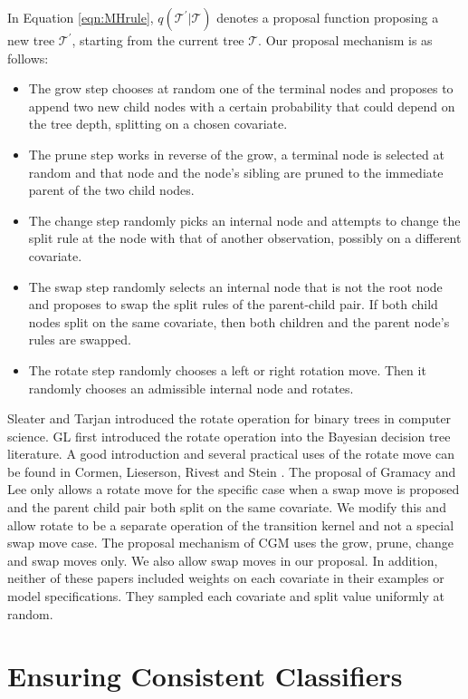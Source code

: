  In Equation \ref{eqn:MHrule}, $q(\mathcal{T}^\prime\vert\mathcal{T})$ denotes a proposal function proposing a new tree $\mathcal{T}^\prime$, starting from the current tree $\mathcal{T}$. 
 Our proposal mechanism is as follows:
  \begin{itemize}
 \item The grow step chooses at random one of the terminal nodes and proposes to append two new child nodes with a certain probability that could depend on the tree depth, splitting on a chosen covariate.
 \item The prune step works in reverse of the grow, a terminal node is selected at random and that node and the node's sibling are pruned to the immediate parent of the two child nodes.
 \item The change step randomly picks an internal node and attempts to change the split rule at the node with that of another observation, possibly on a different covariate.
  \item The swap step randomly selects an internal node that is not the root node and proposes to swap the split rules of the parent-child pair. If both child nodes split on the same covariate, then both children and the parent node's rules are swapped.
  \item The rotate step randomly chooses a left or right rotation move. Then it randomly chooses an admissible internal node and rotates.
 \end{itemize}
 Sleater and Tarjan \cite{sleator1985self} introduced the rotate operation for binary trees in computer science. GL \cite{gramacy2008bayesian} first introduced the rotate operation into the Bayesian decision tree literature. A good introduction and several practical uses of the rotate move can be found in Cormen, Lieserson, Rivest and Stein \cite{cormen2001introduction}. The proposal of Gramacy and Lee \cite{gramacy2008bayesian} only allows a rotate move for the specific case when a swap move is proposed and the parent child pair both split on the same covariate. We modify this and allow rotate to be a separate operation of the transition kernel and not a special swap move case. The proposal mechanism of CGM uses the grow, prune, change and swap moves only. We also allow swap moves in our proposal. In addition, neither of these papers included weights on each covariate in their examples or model specifications. They sampled each covariate and split value uniformly at random. 

\section{Ensuring Consistent Classifiers}\label{sec:ecc}


